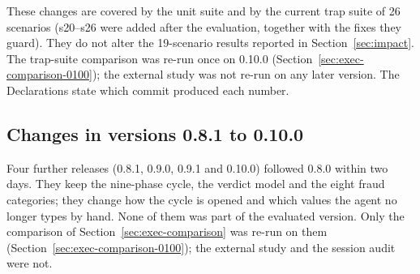 \documentclass{sbc2019}%
\begin{document}
These changes are covered by the unit suite and by the current trap suite of
26 scenarios (s20--s26 were added after the evaluation, together with the
fixes they guard). They do not alter the 19-scenario results reported in
Section~\ref{sec:impact}. The trap-suite comparison was re-run once on 0.10.0
(Section~\ref{sec:exec-comparison-0100}); the external study was not re-run on
any later version. The Declarations state which commit produced each number.

\subsection{Changes in versions 0.8.1 to 0.10.0}
\label{sec:release-0100}

Four further releases (0.8.1, 0.9.0, 0.9.1 and 0.10.0) followed 0.8.0 within two days. They keep the
nine-phase cycle, the verdict model and the eight fraud categories; they
change how the cycle is opened and which values the agent no longer types by
hand. None of them was part of the evaluated version. Only the comparison of
Section~\ref{sec:exec-comparison} was re-run on them
(Section~\ref{sec:exec-comparison-0100}); the external study and the
session audit were not.
\end{document}
